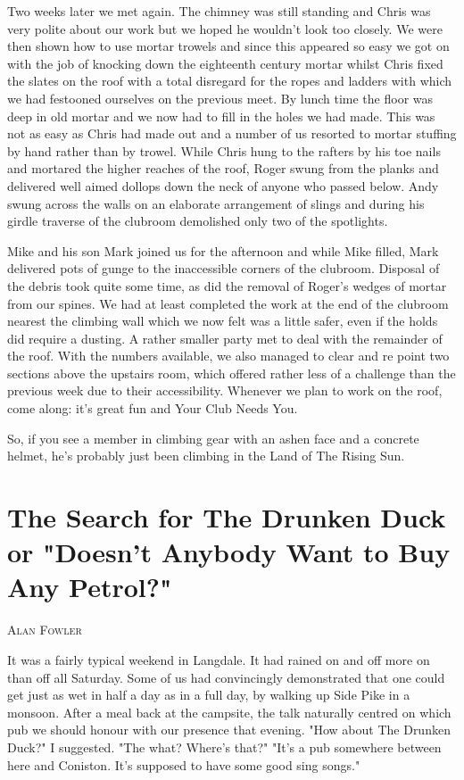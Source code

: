 \documentclass[a5paper,openany,font 10pt]{scrbook}
\makeatletter
\newcommand{\chapterauthor}[1]{%
{\parindent0pt\vspace*{-5pt}%
\linespread{1.1}\large\scshape#1%
\par\nobreak\vspace*{35pt}}
\@afterheading%
}
\makeatother
\begin{document}
Two weeks later we met again. The chimney was still standing
and Chris was very polite about our work but we hoped he wouldn't
look too closely. We were then shown how to use mortar trowels
and since this appeared so easy we got on with the job of
knocking down the eighteenth century mortar whilst Chris fixed
the slates on the roof with a total disregard for the ropes and
ladders with which we had festooned ourselves on the previous
meet. By lunch time the floor was deep in old mortar and we now
had to fill in the holes we had made. This was not as easy as
Chris had made out and a number of us resorted to mortar stuffing
by hand rather than by trowel. While Chris hung to the rafters by
his toe nails and mortared the higher reaches of the roof, Roger
swung from the planks and delivered well aimed dollops down the
neck of anyone who passed below. Andy swung across the walls on
an elaborate arrangement of slings and during his girdle traverse
of the clubroom demolished only two of the spotlights.

Mike and his son Mark joined us for the afternoon and while
Mike filled, Mark delivered pots of gunge to the inaccessible
corners of the clubroom. Disposal of the debris took quite some
time, as did the removal of Roger's wedges of mortar from our
spines. We had at least completed the work at the end of the
clubroom nearest the climbing wall which we now felt was a little
safer, even if the holds did require a dusting. A rather smaller
party met to deal with the remainder of the roof. With the
numbers available, we also managed to clear and re point two
sections above the upstairs room, which offered rather less of a
challenge than the previous week due to their accessibility.
Whenever we plan to work on  the roof, come along: it's great fun
and Your Club Needs You.

So, if you see a member in climbing gear with an ashen face
and a concrete helmet, he's probably just been climbing in the
Land of The Rising Sun.

\chapter{The Search for The Drunken Duck or "Doesn't Anybody Want to Buy Any Petrol?"}
\label{sec:org5a4661b}
\chapterauthor{Alan Fowler}

It was a fairly typical weekend in Langdale. It had rained
on and off  more on than off  all Saturday. Some of us had
convincingly demonstrated that one could get just as wet in half
a day as in a full day, by walking up Side Pike in a monsoon.
After a meal back at the campsite, the talk naturally
centred on which pub we should honour with our presence that
evening.
"How about The Drunken Duck?" I suggested.
"The what? Where's that?"
"It's a pub somewhere between here and Coniston. It's
supposed to have some good sing songs."
\end{document}
